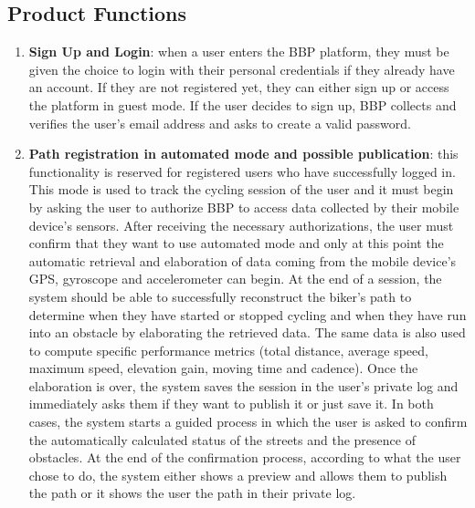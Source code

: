 \documentclass{article}
\begin{document}
\subsection{Product Functions}
\begin{enumerate}
    \item \textbf{Sign Up and Login}: when a user enters the BBP platform, they must be given the choice to login with their personal credentials if they already have an account. If they are not registered yet, they can either sign up or access the platform in guest mode. If the user decides to sign up, BBP collects and verifies the user's email address and asks to create a valid password.
    \item \textbf{Path registration in automated mode and possible publication}: this functionality is reserved for registered users who have successfully logged in. This mode is used to track the cycling session of the user and it must begin by asking the user to authorize BBP to access data collected by their mobile device's sensors. After receiving the necessary authorizations, the user must confirm that they want to use automated mode and only at this point the automatic retrieval and elaboration of data coming from the mobile device's GPS, gyroscope and accelerometer can begin. At the end of a session, the system should be able to successfully reconstruct the biker's path to determine when they have started or stopped cycling and when they have run into an obstacle by elaborating the retrieved data. The same data is also used to compute specific performance metrics (total distance, average speed, maximum speed, elevation gain, moving time and cadence). Once the elaboration is over, the system saves the session in the user's private log and immediately asks them if they want to publish it or just save it. In both cases, the system starts a guided process in which the user is asked to confirm the automatically calculated status of the streets and the presence of obstacles. At the end of the confirmation process, according to what the user chose to do, the system either shows a preview and allows them to publish the path or it shows the user the path in their private log.

\end{enumerate}
\end{document}
